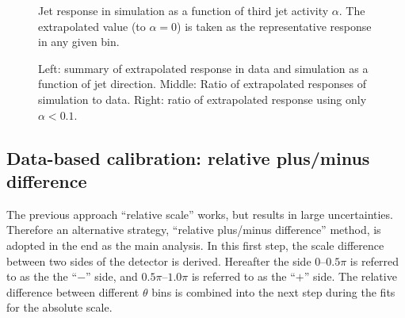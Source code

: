 \begin{figure}[htp!]
    \centering
    \caption{Jet response in simulation as a function of third jet activity $\alpha$.  The extrapolated value (to $\alpha = 0$) is taken as the representative response in any given bin.}
    \label{Figure:JetCalibration-RelativeResidualMC}
\end{figure}

\begin{figure}[htp!]
    \centering
    \caption{Left: summary of extrapolated response in data and simulation as a function of jet direction.  Middle: Ratio of extrapolated responses of simulation to data.  Right: ratio of extrapolated response using only $\alpha < 0.1$.}
    \label{Figure:JetCalibration-RelativeResidual}
\end{figure}

\clearpage

\subsection{Data-based calibration: relative plus/minus difference}
\label{Subsection:RelativeSide}

The previous approach ``relative scale'' works, but results in large uncertainties.  Therefore an alternative strategy, ``relative plus/minus difference'' method, is adopted in the end as the main analysis. In this first step, the scale difference between two sides of the detector is derived.  Hereafter the side 0--$0.5\pi$ is referred to as the the ``$-$'' side, and $0.5\pi$--$1.0\pi$ is referred to as the ``$+$'' side.  The relative difference between different $\theta$ bins is combined into the next step during the fits for the absolute scale.

